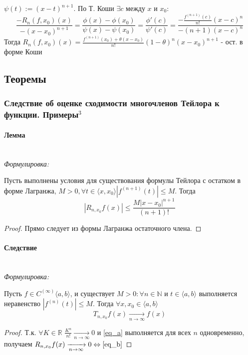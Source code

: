 \documentclass{article}
\let\vanillaparagraph\paragraph
\renewcommand{\paragraph}[1]{\vanillaparagraph{#1}\mbox{}\\}
\begin{document}
$\psi(t) := (x-t)^{n+1}$. По Т. Коши $\exists c$ между $x$ и $x_0:$
$$
\frac{-R_n(f, x_0)(x)}{-(x-x_0)^{n+1}} = \frac{\phi(x)-\phi(x_0)}{\psi(x)-\psi(x_0)} = \frac{\phi'(c)}{\psi'(c)} = \frac{-\frac{f^{(n+1)} (c) }{n!} (x-c)^n}{-(n+1)(x-c)^n}
$$
Тогда $R_n(f, x_0)(x) = \frac{f^{(n+1)}(x_0)+\theta(x-x_0)}{n!} (1-\theta)^n(x-x_0)^{n+1}$ - ост. в форме Коши

\newpage

\subsection{Теоремы}

\subsubsection{Следствие об оценке сходимости многочленов Тейлора к функции. Примеры\texorpdfstring{$^3$}{}}
\paragraph{Лемма}

\textit{Формулировка: }

Пусть выполнены условия для существования формулы Тейлора с остатком в форме Лагранжа, $M > 0, \forall t\in \langle x, x_0\rangle|f^{(n+1)}(t)| \leq M$. Тогда 
\begin{equation} \label{eq_a}
|R_{n, x_0} f(x)| \leq \frac{M|x - x_0|^{n+1}} {(n+1)!} 
\end{equation}

\begin{proof}
Прямо следует из формы Лагранжа остаточного члена.
\end{proof}

\paragraph{Следствие}

\textit{Формулировка: }

Пусть $f \in C^{(\infty)} \langle a, b\rangle$, и существует $M > 0: \forall n \in \mathbb{N} \text{ и } t \in \langle a, b\rangle$ выполняется неравенство $| f^{(n)}(t)| \leq M$. Тогда $\forall x, x_0 \in \langle a, b\rangle$
\begin{equation} \label{eq_b}
T_{n, x_0} f(x) \xrightarrow[n\to\infty]{}f(x)
\end{equation}

\begin{proof}
Т.к. $\forall K \in \mathbb{R}$ $ \frac{K^n} {n!} \xrightarrow[n\to\infty]{} 0$ и \eqref{eq_a} выполняется для всех $n$ одновременно, получаем $R_{n, x_0}f(x) \xrightarrow[n \to\infty]{} 0 \Leftrightarrow \eqref{eq_b}$
\end{proof}
\end{document}
